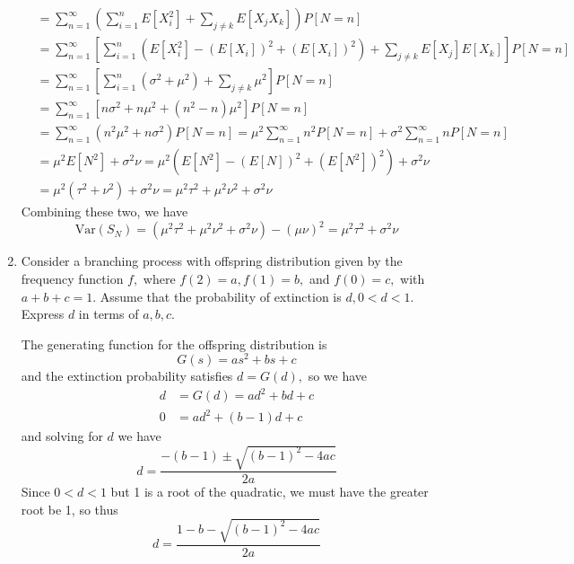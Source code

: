 \documentclass{article}
\newcommand{\var}{\mathrm{Var}}
\begin{document}
\begin{enumerate}
\begin{soln}
\begin{align*}
				&= \sum_{n=1}^{\infty} \left( \sum_{i=1}^{n} E[X_i^2] + \sum_{j\neq k}^{} E[X_j X_k] \right) P[N=n] \\
				&= \sum_{n=1}^{\infty} \left[ \sum_{i=1}^{n} \left( E[X_i^2]-(E[X_i])^2 + (E[X_i])^2 \right) + \sum_{j\neq k}^{}E[X_j]E[X_k] \right]P[N=n] \\
				&= \sum_{n=1}^{\infty} \left[ \sum_{i=1}^{n} (\sigma^2+\mu^2) + \sum_{j\neq k}^{} \mu^2 \right]P[N=n] \\
				&= \sum_{n=1}^{\infty} \left[ n\sigma^2+n\mu^2 + (n^2-n)\mu^2 \right]P[N=n] \\
				&= \sum_{n=1}^{\infty} (n^2\mu^2 + n\sigma^2)P[N=n] = \mu^2\sum_{n=1}^{\infty} n^2P[N=n] + \sigma^2\sum_{n=1}^{\infty} nP[N=n] \\
				&= \mu^2 E[N^2] + \sigma^2 \nu = \mu^2\left( E[N^2]-(E[N])^2 + (E[N^2])^2 \right) + \sigma^2 \nu \\
				&= \mu^2(\tau^2+\nu^2) + \sigma^2\nu = \mu^2\tau^2 + \mu^2\nu^2 + \sigma^2\nu
			\end{align*}
			Combining these two, we have
			\[\var(S_N) = (\mu^2\tau^2+\mu^2\nu^2+\sigma^2\nu) - (\mu\nu)^2 = \mu^2\tau^2+\sigma^2\nu\]
		\end{soln}

	\item Consider a branching process with offspring distribution given by the frequency function $f,$ where $f(2)=a, f(1)=b,$ and $f(0)=c,$ with $a+b+c=1.$ Assume that the probability of extinction is $d, 0<d<1.$ Express $d$ in terms of $a, b, c.$
		\begin{soln}
			The generating function for the offspring distribution is
			\[G(s)=as^2+bs+c\]
			and the extinction probability satisfies $d=G(d),$ so we have
			\begin{align*}
				d &= G(d)=ad^2+bd+c \\
				0 &= ad^2+(b-1)d+c
			\end{align*}
			and solving for $d$ we have
			\[d=\frac{-(b-1)\pm\sqrt{(b-1)^2-4ac}}{2a}\]
			Since $0<d<1$ but 1 is a root of the quadratic, we must have the greater root be 1, so thus
			\[d=\frac{1-b-\sqrt{(b-1)^2-4ac}}{2a}\]
		\end{soln}


\end{enumerate}
\end{document}
